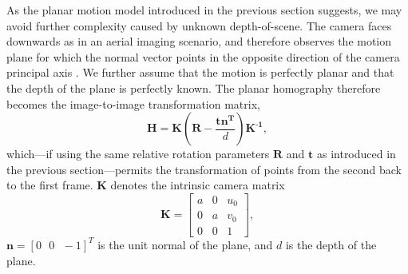 \documentclass[letterpaper, 10 pt, conference]{ieeeconf}  %
\begin{document}
As the planar motion model introduced in the previous section suggests, we may avoid further complexity caused by unknown depth-of-scene. The camera faces downwards as in an aerial imaging scenario, and therefore observes the motion plane for which the normal vector points in the opposite direction of the camera principal axis \cite{hartley2003multiple,ma2012invitation}. We further assume that the motion is perfectly planar and that the depth of the plane is perfectly known. The planar homography therefore becomes the image-to-image transformation matrix,
%
\begin{equation}
    \label{homography}
    \textbf{H} = \textbf{K}(\textbf{R}-\frac{\textbf{t}\textbf{n}^\textbf{T}}{d})\textbf{K}^{\textbf{-1}},
\end{equation}
%
which---if using the same relative rotation parameters $\mathbf{R}$ and $\mathbf{t}$ as introduced in the previous section---permits the transformation of points from the second back to the first frame. $\mathbf{K}$ denotes the intrinsic camera matrix
%
\begin{equation}
    \label{camera_intrinsic_matrix}
    \textbf{K} = \left[
			        \begin{matrix}
			            a & 0 & u_0 \\
			            0 & a & v_0 \\
			            0 & 0 & 1
			        \end{matrix}
        		 \right],
\end{equation}
%
$\mathbf{n}=[0 \text{ } 0 \text{ } -1]^{T}$ is the unit normal of the plane, and $d$ is the depth of the plane.
\end{document}

